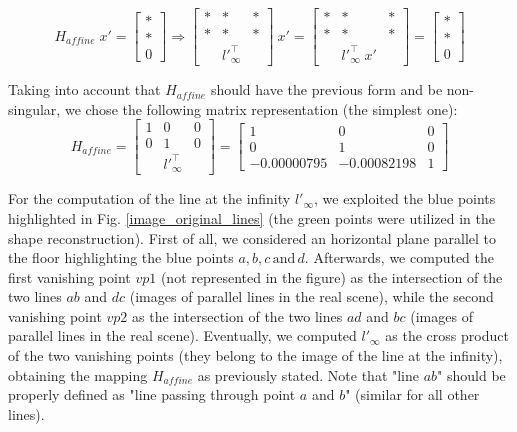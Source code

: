 \documentclass[11pt, oneside]{article}
\begin{document}
\begin{equation}
	H_{affine} \; x' = 
	\begin{bmatrix}
		* \\ * \\ 0
	\end{bmatrix}
	\Rightarrow
	\begin{bmatrix}
		* & * & * \\ * & * & * \\ & {l'}^{\intercal}_{\infty} &
	\end{bmatrix}
	\: x' =
	\begin{bmatrix}
		* & * & * \\ * & * & * \\ & {l'}^{\intercal}_{\infty} \; x' &
	\end{bmatrix}
	=
	\begin{bmatrix}
		* \\ * \\ 0
	\end{bmatrix}
\end{equation}

Taking into account that $H_{affine}$ should have the previous form and be non-singular, we chose the following matrix representation (the simplest one):
\begin{equation}
	H_{affine} =
	\begin{bmatrix}
		1 & 0 & 0 \\ 0 & 1 & 0 \\ & {l'}^{\intercal}_{\infty} &
	\end{bmatrix}
	=
	\begin{bmatrix}
		1 & 0 & 0 \\ 0 & 1 & 0 \\ -0.00000795 & -0.00082198 & 1
	\end{bmatrix}
\end{equation}

For the computation of the line at the infinity $l'_{\infty}$, we exploited the blue points highlighted in Fig. \ref{image_original_lines} (the green points were utilized in the shape reconstruction). First of all, we considered an horizontal plane parallel to the floor highlighting the blue points $a, b, c \, \text{and}\, d$. Afterwards, we computed the first vanishing point $vp1$ (not represented in the figure) as the intersection of the two lines $ab$ and $dc$ (images of parallel lines in the real scene), while the second vanishing point $vp2$ as the intersection of the two lines $ad$ and $bc$ (images of parallel lines in the real scene). Eventually, we computed $l'_{\infty}$ as the cross product of the two vanishing points (they belong to the image of the line at the infinity), obtaining the mapping $H_{affine}$ as previously stated. Note that "line $ab$" should be properly defined as "line passing through point $a$ and $b$" (similar for all other lines).
\end{document}
